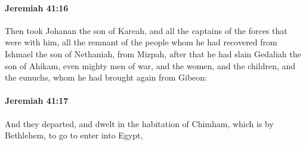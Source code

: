 		\paragraph{Jeremiah 41:16} %
			\label{JEREMIAH-41-16}

			Then took Johanan the son of Kareah, and all the captains of the forces that were with him, all the remnant of the people whom he had recovered from Ishmael the son of Nethaniah, from Mizpah, after that he had slain Gedaliah the son of Ahikam, even mighty men of war, and the women, and the children, and the eunuchs, whom he had brought again from Gibeon:


		\paragraph{Jeremiah 41:17} %
			\label{JEREMIAH-41-17}

			And they departed, and dwelt in the habitation of Chimham, which is by Bethlehem, to go to enter into Egypt,

